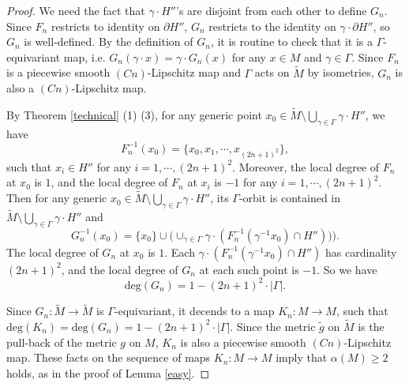 \documentclass[10pt,a4paper]{amsart}
\begin{document}
\begin{proof}

We need the fact that $\gamma\cdot H''$'s are disjoint from each other to define $G_n$. Since $F_n$ restricts to identity on $\partial H''$, $G_n$ restricts to the identity on $\gamma\cdot \partial H''$, so $G_n$ is well-defined. By the definition of $G_n$, it is routine to check that it is a $\Gamma$-equivariant map, i.e. $G_n(\gamma\cdot x)=\gamma\cdot G_n(x)$ for any $x\in M$ and $\gamma\in \Gamma$. Since $F_n$ is a piecewise smooth $(Cn)$-Lipschitz map and $\Gamma$ acts on $\tilde{M}$ by isometries, $G_n$ is also a $(Cn)$-Lipschitz map.

By Theorem \ref{technical} (1) (3), for any generic point $x_0 \in \tilde{M}\setminus \bigcup_{\gamma\in \Gamma}\gamma \cdot H''$, we have 
$$F_n^{-1}(x_0)=\{x_0,x_1,\cdots,  x_{(2n+1)^2}\},$$ 
such that $x_i\in H''$ for any $i=1,\cdots, (2n+1)^2$. Moreover, the local degree of $F_n$ at $x_0$ is $1$, and the local degree of $F_n$ at $x_i$ is $-1$ for any $i=1,\cdots, (2n+1)^2$. Then for any generic $x_0\in \tilde{M}\setminus \bigcup_{\gamma\in \Gamma}\gamma \cdot H''$, its $\Gamma$-orbit is contained in $\tilde{M}\setminus \bigcup_{\gamma\in \Gamma}\gamma \cdot H''$ and
$$G_n^{-1}(x_0)=\{x_0\}\cup \Big(\cup_{\gamma\in \Gamma}\gamma\cdot (F_n^{-1}(\gamma^{-1}x_0)\cap H''))\Big).$$
The local degree of $G_n$ at $x_0$ is $1$. Each $\gamma\cdot (F_n^{-1}(\gamma^{-1}x_0)\cap H'')$ has cardinality $(2n+1)^2$, and the local degree of $G_n$ at each such point is $-1$. So we have 
$$\text{deg}(G_n)=1-(2n+1)^2\cdot |\Gamma|.$$

Since $G_n:\tilde{M} \to \tilde{M}$ is $\Gamma$-equivariant, it decends to a map $K_n:M\to M$, such that $\text{deg}(K_n)=\text{deg}(G_n)=1-(2n+1)^2\cdot |\Gamma|$. Since the metric $\tilde{g}$ on $\tilde{M}$ is the pull-back of the metric $g$ on $M$, $K_n$ is also a piecewise smooth $(Cn)$-Lipschitz map.  These facts on the sequence of maps $K_n: M\to M$ imply that $\alpha(M)\geq 2$ holds, as in the proof of Lemma \ref{easy}.
\end{proof}
\end{document}
